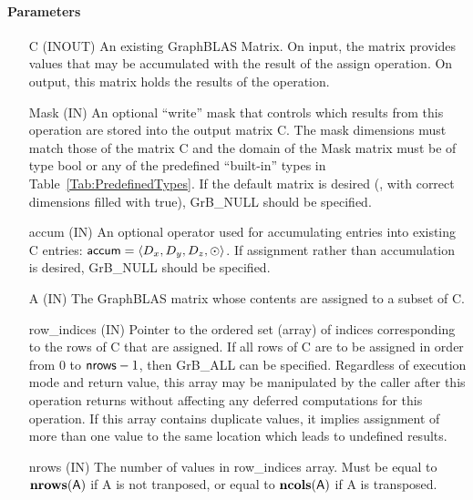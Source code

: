 \paragraph{Parameters}

\begin{itemize}[leftmargin=1in]
    \item[{\sf C}]    ({\sf INOUT}) An existing GraphBLAS Matrix.  On input,
    the matrix provides values that may be accumulated with the result of the
    assign operation.  On output, this matrix holds the results of the
    operation.

    \item[{\sf Mask}] ({\sf IN}) An optional ``write'' mask that controls which
    results from this operation are stored into the output matrix {\sf C}. The 
    mask dimensions must match those of the matrix {\sf C} and the domain of the 
    {\sf Mask} matrix must be of type {\sf bool} or any of the predefined 
    ``built-in'' types in Table~\ref{Tab:PredefinedTypes}.  If the default
    matrix is desired (\ie, with correct dimensions filled with {\sf true}), 
    {\sf GrB\_NULL} should be specified.

    \item[{\sf accum}]    ({\sf IN}) An optional operator used for accumulating
    entries into existing {\sf C} entries: ${\sf accum} = \langle D_x,
    D_y, D_z,\odot \rangle$. If assignment rather than accumulation is
    desired, {\sf GrB\_NULL} should be specified.

    \item[{\sf A}]       ({\sf IN}) The GraphBLAS matrix whose contents are 
    assigned to a subset of {\sf C}.
    
    \item[{\sf row\_indices}]  ({\sf IN}) Pointer to the ordered set (array) of 
    indices corresponding to the rows of {\sf C} that are assigned.  If all rows
    of {\sf C} are to be assigned in order from $0$ to ${\sf nrows} - 1$, then 
    {\sf GrB\_ALL} can be specified.  Regardless of execution mode and return 
    value, this array may be manipulated by the caller after this operation 
    returns without affecting any deferred computations for this operation.
    If this array contains duplicate values, it implies assignment of more 
    than one value to the same location which leads to undefined results.

    \item[{\sf nrows}] ({\sf IN}) The number of values in {\sf row\_indices} 
	array. Must be equal to $\bold{nrows}({\sf A})$ if {\sf A} is not tranposed,
	or equal to $\bold{ncols}({\sf A})$ if {\sf A} is transposed.


\end{itemize}
